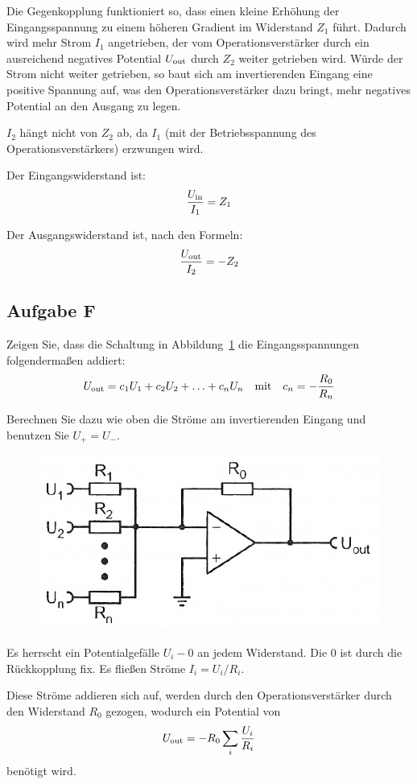 Die Gegenkopplung funktioniert so, dass einen kleine Erhöhung der
Eingangsspannung zu einem höheren Gradient im Widerstand $Z_1$ führt. Dadurch
wird mehr Strom $I_1$ angetrieben, der vom Operationsverstärker durch ein
ausreichend negatives Potential $U_\text{out}$ durch $Z_2$ weiter getrieben wird.
Würde der Strom nicht weiter getrieben, so baut sich am invertierenden Eingang
eine positive Spannung auf, was den Operationsverstärker dazu bringt, mehr
negatives Potential an den Ausgang zu legen.

$I_2$ hängt nicht von $Z_2$ ab, da $I_1$ (mit der Betriebsspannung des
Operationsverstärkers) erzwungen wird. 

Der Eingangswiderstand ist:
\[
	\frac{U_\text{in}}{I_1} = Z_1
\]

Der Ausgangswiderstand ist, nach den Formeln:
\[
	\frac{U_\text{out}}{I_2} = - Z_2
\]

\subsection{Aufgabe F}

\begin{problem}
	Zeigen Sie, dass die Schaltung in Abbildung~\ref{fig:5_6-6} die
	Eingangsspannungen folgendermaßen addiert:
	\[
		U_\text{out} = c_1 U_1 + c_2 U_2 + \ldots + c_n U_n
		\quad \text{mit} \quad
		c_n = - \frac{R_0}{R_n}
	\]

	Berechnen Sie dazu wie oben die Ströme am invertierenden Eingang und
	benutzen Sie $U_+ = U_-$.
\end{problem}

\begin{figure}[htbp]
	\centering
	\includegraphics[width=.6\linewidth]{Anleitung/5_6-6.png}
	\caption{%
		\cite[Abbildung~5/6.6]{physik313-Anleitung}
	}
	\label{fig:5_6-6}
\end{figure}

Es herrscht ein Potentialgefälle $U_i - 0$ an jedem Widerstand. Die 0 ist
durch die Rückkopplung fix. Es fließen Ströme $I_i = U_i / R_i$.

Diese Ströme addieren sich auf, werden durch den Operationsverstärker durch den
Widerstand $R_0$ gezogen, wodurch ein Potential von
\[
	U_\text{out} = - R_0 \sum_i \frac{U_i}{R_i}
\]
benötigt wird.

